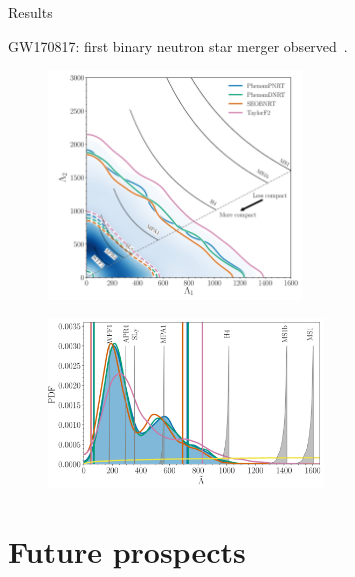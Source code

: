 \documentclass[usenames,dvipsnames,t]{beamer}
\begin{document}
\begin{frame}{Results}

  \def\x{3mm}

  GW170817: first binary neutron star merger observed~\cite{GW170817_properties}.
  

  {
    \begin{figure}
      \centering
      \includegraphics[width=0.6\textwidth]{Figures/GW170817_lambdas.png}
    \end{figure}
  }

  {
    \begin{figure}
      \centering
      \includegraphics[width=0.65\textwidth]{Figures/GW170817_lambda_tilde.png}
    \end{figure}
  }
\end{frame}

\section{Future prospects}
\end{document}
